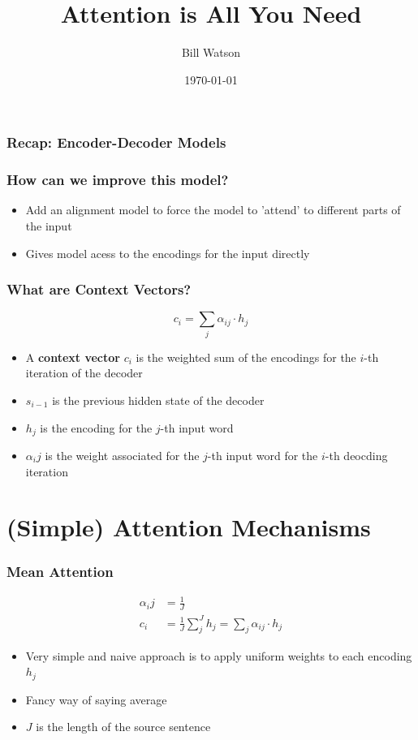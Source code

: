 \documentclass{beamer}
\title{Attention is All You Need}
\author{Bill Watson}
\institute{S\&P Global}
\date{\today}
\begin{document}
\begin{frame}
\titlepage
\end{frame}


\begin{frame}
\frametitle{Recap: Encoder-Decoder Models}

\end{frame}

\begin{frame}
\frametitle{How can we improve this model?}
\begin{itemize}
  \item Add an alignment model to force the model to 'attend' to different parts of the input
  \item Gives model acess to the encodings for the input directly
\end{itemize}
\end{frame}

\begin{frame}
\frametitle{What are Context Vectors?}
\begin{equation*}
  c_i = \sum_{j} \alpha_{ij} \cdot h_j
\end{equation*}
\begin{itemize}
  \item A \textbf{context vector} $c_i$ is the weighted sum of the encodings for the $i$-th iteration of the decoder
  \item $s_{i-1}$ is the previous hidden state of the decoder
  \item $h_j$ is the encoding for the $j$-th input word
  \item $\alpha_ij$ is the weight associated for the $j$-th input word for the $i$-th deocding iteration
\end{itemize}
\end{frame}

\section{(Simple) Attention Mechanisms}

\begin{frame}
\frametitle{Mean Attention}
\begin{equation*}
  \begin{split}
  \alpha_ij &= \frac{1}{J} \\
  c_i &= \frac{1}{J} \sum_j^J h_j = \sum_{j} \alpha_{ij} \cdot h_j
  \end{split}
\end{equation*}
\begin{itemize}
  \item Very simple and naive approach is to apply uniform weights to each encoding $h_j$
  \item Fancy way of saying average
  \item $J$ is the length of the source sentence
\end{itemize}
\end{frame}
\end{document}
